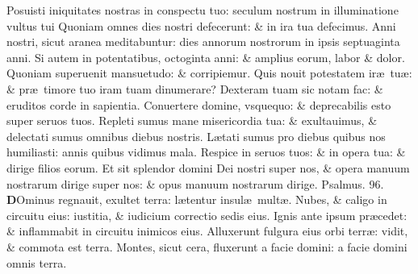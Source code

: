 \documentclass[a5paper,10pt]{book}
\def\ae{æ}
\begin{document}
\begin{multicols*}{2}
\newline \color{red} P\color{black}osuisti iniquitates nostras in conspectu tuo: seculum nostrum in illuminatione vultus tui
\newline \color{red} Q\color{black}uoniam omnes dies nostri defecerunt: \& in ira tua defecimus.
\newline \color{red} A\color{black}nni nostri, sicut aranea meditabuntur: dies annorum nostrorum in ipsis septuaginta anni.
\newline \color{red} S\color{black}i autem in potentatibus, octoginta anni: \& amplius eorum, labor \& dolor.
\newline \color{red} Q\color{black}uoniam superuenit mansuetudo: \& corripiemur.
\newline \color{red} Q\color{black}uis nouit potestatem ir\ae \ tu\ae : \& pr\ae \ timore tuo iram tuam dinumerare?
\newline \color{red} D\color{black}exteram tuam sic notam fac: \& eruditos corde in sapientia.
\newline \color{red} C\color{black}onuertere domine, vsquequo: \& deprecabilis esto super seruos tuos.
\newline \color{red} R\color{black}epleti sumus mane misericordia tua: \& exultauimus, \& delectati sumus omnibus diebus nostris.
\newline \color{red} L\color{black}\ae tati sumus pro diebus quibus nos humiliasti: annis quibus vidimus mala.
\newline \color{red} R\color{black}espice in seruos tuos: \& in opera tua: \& dirige filios eorum.
\newline \color{red} E\color{black}t sit splendor domini Dei nostri super nos, \& opera manuum nostrarum dirige super nos: \& opus manuum nostrarum dirige. \quad \color{red} Psalmus. \hypertarget{ps96}{96.} \color{black}
\vspace{-1em}
\lettrine[lines=2]{\bfseries \color{red} D}{}Ominus regnauit, exultet terra: l\ae tentur insul\ae \ mult\ae .
\newline \color{red} N\color{black}ubes, \& caligo in circuitu eius: iustitia, \& iudicium correctio sedis eius.
\newline \color{red} I\color{black}gnis ante ipsum pr\ae cedet: \& inflammabit in circuitu inimicos eius.
\newline \color{red} A\color{black}lluxerunt fulgura eius orbi terr\ae : vidit, \& commota est terra.%
\newline \color{red} M\color{black}ontes, sicut cera, fluxerunt a facie domini: a facie domini omnis terra.

\end{multicols*}
\end{document}
